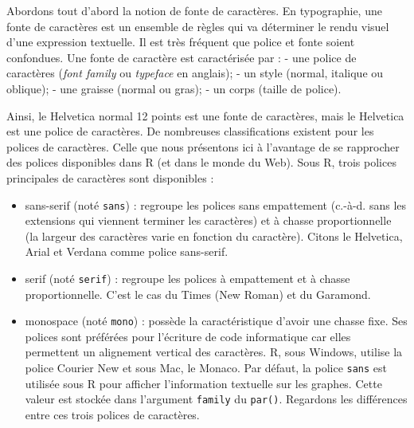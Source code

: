 \documentclass[]{article}
\providecommand{\tightlist}{%
  \setlength{\itemsep}{0pt}\setlength{\parskip}{0pt}}
\begin{document}
Abordons tout d'abord la notion de fonte de caractères. En typographie, une fonte de caractères est un ensemble de règles qui va déterminer le rendu visuel d'une expression textuelle. Il est très fréquent que police et fonte soient confondues. Une fonte de caractère est caractérisée par :
- une police de caractères (\emph{font family} ou \emph{typeface} en anglais);
- un style (normal, italique ou oblique);
- une graisse (normal ou gras);
- un corps (taille de police).

Ainsi, le Helvetica normal 12 points est une fonte de caractères, mais le
Helvetica est une police de caractères. De nombreuses classifications existent
pour les polices de caractères. Celle que nous présentons ici à l'avantage de se
rapprocher des polices disponibles dans R (et dans le monde du Web). Sous R,
trois polices principales de caractères sont disponibles :

\begin{itemize}
\tightlist
\item
  sans-serif (noté \texttt{sans}) : regroupe les polices sans empattement (c.-à-d. sans les extensions qui viennent terminer les caractères) et à chasse proportionnelle (la largeur des caractères varie en fonction du caractère). Citons le Helvetica, Arial et Verdana comme police sans-serif.
\item
  serif (noté \texttt{serif}) : regroupe les polices à empattement et à chasse proportionnelle. C'est le cas du Times (New Roman) et du Garamond.
\item
  monospace (noté \texttt{mono}) : possède la caractéristique d'avoir une chasse fixe. Ses polices sont préférées pour l'écriture de code informatique car elles permettent un alignement vertical des caractères. R, sous Windows, utilise la police Courier New et sous Mac, le Monaco.
  Par défaut, la police \texttt{sans} est utilisée sous R pour afficher l'information textuelle sur les graphes. Cette valeur est stockée dans l'argument \texttt{family} du \texttt{par()}. Regardons les différences entre ces trois polices de caractères.
\end{itemize}
\end{document}
